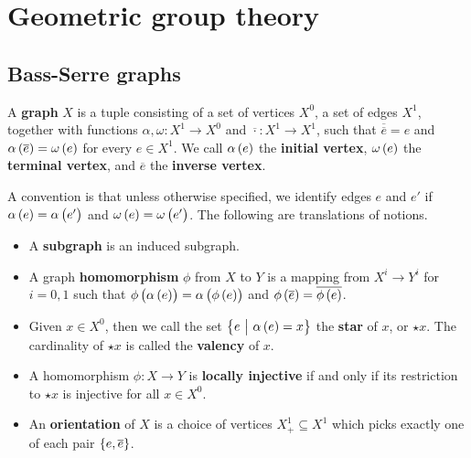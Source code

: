 \section{Geometric group theory}

\subsection{Bass-Serre graphs}

\begin{definition}
A \textbf{graph} $ X $ is a tuple consisting of a set of vertices $ X^0 $, a set of edges $ X^1 $, together with functions $ \alpha, \omega : X^1 \to X^0 $ and $ \overline{\cdot} : X^1 \to X^1 $, such that $ \overline{\overline{e}} = e $ and $ \alpha\br{\overline{e}} = \omega\br{e} $ for every $ e \in X^1 $. We call $ \alpha\br{e} $ the \textbf{initial vertex}, $ \omega\br{e} $ the \textbf{terminal vertex}, and $ \overline{e} $ the \textbf{inverse vertex}.
\end{definition}

A convention is that unless otherwise specified, we identify edges $ e $ and $ e' $ if $ \alpha\br{e} = \alpha\br{e'} $ and $ \omega\br{e} = \omega\br{e'} $. The following are translations of notions.
\begin{itemize}
\item A \textbf{subgraph} is an induced subgraph.
\item A graph \textbf{homomorphism} $ \phi $ from $ X $ to $ Y $ is a mapping from $ X^i \to Y^i $ for $ i = 0, 1 $ such that $ \phi\br{\alpha\br{e}} = \alpha\br{\phi\br{e}} $ and $ \phi\br{\overline{e}} = \overline{\phi\br{e}} $.
\item Given $ x \in X^0 $, then we call the set $ \cbr{e \st \alpha\br{e} = x} $ the \textbf{star} of $ x $, or $ \star x $. The cardinality of $ \star x $ is called the \textbf{valency} of $ x $.
\item A homomorphism $ \phi : X \to Y $ is \textbf{locally injective} if and only if its restriction to $ \star x $ is injective for all $ x \in X^0 $.
\item An \textbf{orientation} of $ X $ is a choice of vertices $ X_+^1 \subseteq X^1 $ which picks exactly one of each pair $ \cbr{e, \overline{e}} $.
\end{itemize}

